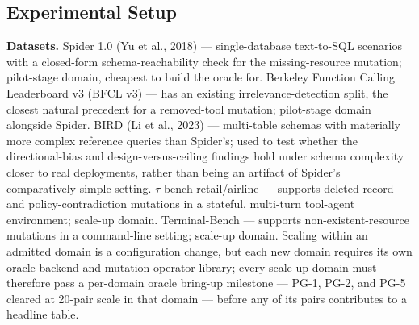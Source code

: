 \documentclass[11pt]{article}
\begin{document}
\subsection{Experimental Setup}

\textbf{Datasets.} Spider 1.0 (Yu et al., 2018) --- single-database text-to-SQL scenarios with a closed-form schema-reachability check for the missing-resource mutation; pilot-stage domain, cheapest to build the oracle for. Berkeley Function Calling Leaderboard v3 (BFCL v3) --- has an existing irrelevance-detection split, the closest natural precedent for a removed-tool mutation; pilot-stage domain alongside Spider. BIRD (Li et al., 2023) --- multi-table schemas with materially more complex reference queries than Spider's; used to test whether the directional-bias and design-versus-ceiling findings hold under schema complexity closer to real deployments, rather than being an artifact of Spider's comparatively simple setting. $\tau$-bench retail/airline --- supports deleted-record and policy-contradiction mutations in a stateful, multi-turn tool-agent environment; scale-up domain. Terminal-Bench --- supports non-existent-resource mutations in a command-line setting; scale-up domain. Scaling within an admitted domain is a configuration change, but each new domain requires its own oracle backend and mutation-operator library; every scale-up domain must therefore pass a per-domain oracle bring-up milestone --- PG-1, PG-2, and PG-5 cleared at 20-pair scale in that domain --- before any of its pairs contributes to a headline table.
\end{document}
